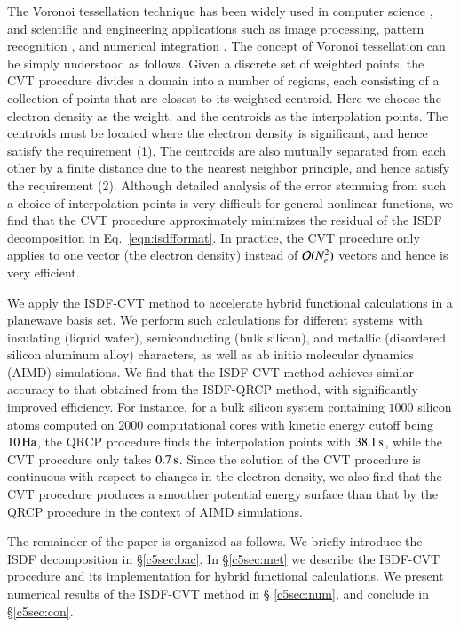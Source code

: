 The Voronoi tessellation technique has been widely used in computer science
\cite{aurenhammer1991voronoi}, and scientific and engineering applications such
as image processing\cite{du2006centroidal}, pattern recognition 
\cite{ogniewicz1995hierarchic}, and numerical integration 
\cite{becke1988multicenter}. The concept of Voronoi tessellation can be simply
understood as follows. Given a discrete set of weighted points, the CVT
procedure divides a domain  into a number of regions, each consisting of a
collection of points that are closest to its weighted centroid. Here we choose
the electron density as the weight, and the centroids as the interpolation
points. The centroids must be located where the electron density is significant,
and hence satisfy the requirement (1). The centroids are also mutually separated
from each other by a finite distance due to the nearest neighbor principle, and
hence satisfy the requirement (2). Although detailed analysis of the error
stemming from such a choice of interpolation points is very difficult for
general nonlinear functions, we find that the CVT procedure approximately
minimizes the residual of the ISDF decomposition in Eq.~\ref{eqn:isdfformat}.
In practice, the CVT procedure only applies to one vector (the electron density)
instead of $\mathcal{O}(N_{e}^2)$ vectors and hence is very efficient.

We apply the ISDF-CVT method to accelerate hybrid functional calculations in a
planewave basis set. We perform such calculations for different systems with
insulating (liquid water), semiconducting (bulk silicon), and metallic 
(disordered silicon aluminum alloy) characters, as well as ab initio molecular
dynamics (AIMD) simulations. We find that the ISDF-CVT method achieves similar
accuracy to that obtained from the ISDF-QRCP method, with significantly improved
efficiency. For instance, for a bulk silicon system containing $1000$ silicon
atoms computed on $2000$ computational cores with kinetic energy cutoff being
$10\operatorname{Ha}$, the QRCP procedure finds the interpolation points with $38.1\operatorname{s}$,
while the CVT procedure only takes $0.7\operatorname{s}$. Since the solution of the CVT
procedure is continuous with respect to changes in the electron density, we also
find that the CVT procedure produces a smoother potential energy surface than
that by the QRCP procedure in the context of AIMD simulations.

The remainder of the paper is organized as follows. We briefly introduce the
ISDF decomposition in \S \ref{c5sec:bac}. In \S \ref{c5sec:met} we describe the
ISDF-CVT procedure and its implementation for hybrid functional calculations. We
present numerical results of the ISDF-CVT method in \S 
\ref{c5sec:num}, and conclude in \S \ref{c5sec:con}.